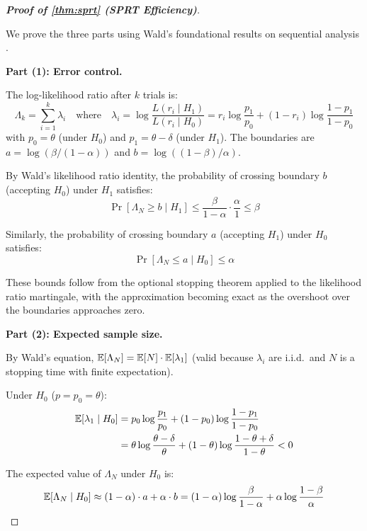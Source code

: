 \begin{proof}[\textbf{Proof of \cref{thm:sprt} (SPRT Efficiency)}]
\label{app:proof:sprt}

We prove the three parts using Wald's foundational results on sequential
analysis \citep{wald1947sequential}.

\textbf{Part (1): Error control.}

The log-likelihood ratio after $k$ trials is:
\begin{equation}
  \Lambda_k = \sum_{i=1}^k \lambda_i
  \quad\text{where}\quad
  \lambda_i = \log\frac{L(r_i \mid H_1)}{L(r_i \mid H_0)}
  = r_i \log\frac{p_1}{p_0} + (1-r_i)\log\frac{1-p_1}{1-p_0}
\end{equation}
with $p_0 = \theta$ (under $H_0$) and $p_1 = \theta - \delta$ (under
$H_1$). The boundaries are $a = \log(\beta/(1-\alpha))$ and
$b = \log((1-\beta)/\alpha)$.

By Wald's likelihood ratio identity, the probability of crossing
boundary $b$ (accepting $H_0$) under $H_1$ satisfies:
\begin{equation}
  \Pr[\Lambda_N \geq b \mid H_1] \leq \frac{\beta}{1-\alpha} \cdot
    \frac{\alpha}{1} \leq \beta
\end{equation}

Similarly, the probability of crossing boundary $a$ (accepting $H_1$)
under $H_0$ satisfies:
\begin{equation}
  \Pr[\Lambda_N \leq a \mid H_0] \leq \alpha
\end{equation}

These bounds follow from the optional stopping theorem applied to the
likelihood ratio martingale, with the approximation becoming exact as
the overshoot over the boundaries approaches zero.

\textbf{Part (2): Expected sample size.}

By Wald's equation, $\mathbb{E}[\Lambda_N] = \mathbb{E}[N] \cdot \mathbb{E}[\lambda_1]$ (valid
because $\lambda_i$ are i.i.d.\ and $N$ is a stopping time with finite
expectation).

Under $H_0$ ($p = p_0 = \theta$):
\begin{align}
  \mathbb{E}[\lambda_1 \mid H_0] &= p_0 \log\frac{p_1}{p_0} +
    (1-p_0)\log\frac{1-p_1}{1-p_0} \\
  &= \theta\log\frac{\theta-\delta}{\theta} +
    (1-\theta)\log\frac{1-\theta+\delta}{1-\theta}
  < 0
\end{align}

The expected value of $\Lambda_N$ under $H_0$ is:
\begin{equation}
  \mathbb{E}[\Lambda_N \mid H_0] \approx
    (1-\alpha) \cdot a + \alpha \cdot b
  = (1-\alpha)\log\frac{\beta}{1-\alpha} +
    \alpha\log\frac{1-\beta}{\alpha}
\end{equation}


\end{proof}
